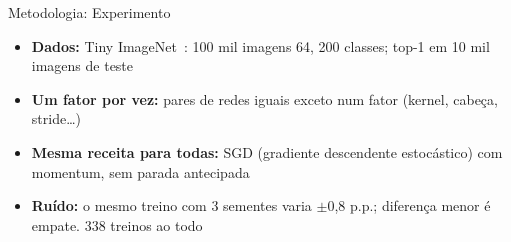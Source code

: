 \documentclass[t,aspectratio=169,12pt,xcolor=table]{beamer}
\newcommand{\by}{\texttimes}
\begin{document}
\begin{frame}{Metodologia: Experimento}
  \begin{itemize}\setlength{\itemsep}{0.35em}
    \item \textbf{Dados:} Tiny ImageNet~\cite{tiny}: 100 mil imagens 64\by64, 200 classes; top-1 em 10 mil imagens de teste
    \item \textbf{Um fator por vez:} pares de redes iguais exceto num fator (kernel, cabeça, stride\ldots)
    \item \textbf{Mesma receita para todas:} SGD (gradiente descendente estocástico) com momentum, sem parada antecipada
    \item \textbf{Ruído:} o mesmo treino com 3 sementes varia $\pm$0,8 p.p.; diferença menor é empate. 338 treinos ao todo
  \end{itemize}
  \medskip
  \centering
\end{frame}
\end{document}
